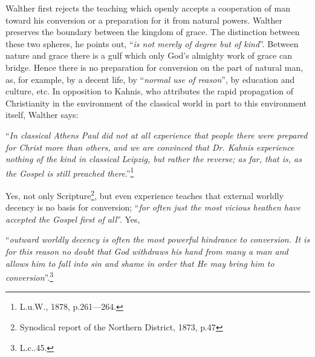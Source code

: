      Walther first rejects the teaching which openly accepts a cooperation of man toward his conversion or a preparation for it from natural powers.  Walther preserves the boundary between the kingdom of grace.  The distinction between these two spheres, he points out, “\textit{is not merely of degree but of kind}”.  Between nature and grace there is a gulf which only God’s almighty work of grace can bridge.  Hence there is no preparation for conversion on the part of natural man, as, for example, by a decent life, by “\textit{normal use of reason}”, by education and culture, etc.  In opposition to Kahnis, who attributes the rapid propagation of Christianity in the environment of the classical world in part to this environment itself, Walther says: \begin{displayquote}``\textit{In classical Athens Paul did not at all experience that people there were prepared for Christ more than others, and we are convinced that Dr. Kahnis experience nothing of the kind in classical Leipzig, but rather the reverse; as far, that is, as the Gospel is still preached there}.”\footnote{L.u.W., 1878, p.261—264.}\end{displayquote}  Yes, not only Scripture\footnote{Synodical report of the Northern District, 1873, p.47}, but even experience teaches that external worldly decency is no basis for conversion; “\textit{for often just the most vicious heathen have accepted the Gospel first of all}”.  Yes, \begin{displayquote}“\textit{outward worldly decency is often the most powerful hindrance to conversion.  It is for this reason no doubt that God withdraws his hand from many a man and allows him to fall into sin and shame in order that He may bring him to conversion}”.\footnote{L.c..45.}\end{displayquote}

